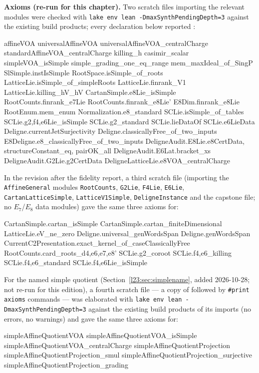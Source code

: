 \textbf{Axioms (re-run for this chapter).} Two scratch files importing the relevant modules were checked with
\texttt{lake env lean -DmaxSynthPendingDepth=3} against the existing build products; every declaration below reported
:
\begin{plaincode}
affineVOA  universalAffineVOA  universalAffineVOA_centralCharge  standardAffineVOA_centralCharge
killing_h  casimir_scalar  simpleVOA_isSimple  simple_grading_one_eq_range
mem_maxIdeal_of_SingP  SlSimple.instIsSimple  RootSpace.isSimple_of_roots
LatticeLie.isSimple_of_simpleRoots  LatticeLie.finrank_V1  LatticeLie.killing_hV_hV
CartanSimple.e8Lie_isSimple  RootCounts.finrank_e7Lie  RootCounts.finrank_e8Lie'
E8Dim.finrank_e8Lie  RootEnum.mem_enum  Normalization.e8_standard
SCLie.isSimple_of_tables  SCLie.{g2,f4,e6}Lie_isSimple  SCLie.g2_standard
SCLie.lieDataOf  SCLie.e6LieData  Deligne.currentJetSurjectivity
Deligne.classicallyFree_of_two_inputs  E8Deligne.e8_classicallyFree_of_two_inputs
DeligneAudit.E8Lie.{e8CertData, structureConstant_eq, pairOK_all}
DeligneAudit.E6Lat.bracket_xs  DeligneAudit.G2Lie.g2CertData
DeligneLatticeLie.e8VOA_centralCharge
\end{plaincode}
In the revision after the fidelity report, a third scratch file (importing the \texttt{AffineGeneral} modules \texttt{RootCounts}, \texttt{G2Lie}, \texttt{F4Lie},
\texttt{E6Lie}, \texttt{CartanLatticeSimple}, \texttt{LatticeV1Simple}, \texttt{DeligneInstance} and the capstone file; no $E_7$/$E_8$
data modules) gave the same three axioms for:
\begin{plaincode}
CartanSimple.cartan_isSimple  CartanSimple.cartan_finiteDimensional  LatticeLie.eV_ne_zero
Deligne.universal_genWordsSpan  Deligne.genWordsSpan
CurrentC2Presentation.exact_kernel_of_caseClassicallyFree
RootCounts.card_roots_{d4,e6,e7,e8'}  SCLie.g2_coroot
SCLie.{f4,e6}_killing  SCLie.{f4,e6}_standard  SCLie.{f4,e6}Lie_isSimple
\end{plaincode}
For the named simple quotient (Section~\ref{l23:sec:simplename}, added 2026-10-28; not re-run for this edition), a fourth scratch file --- a copy of
 followed by \texttt{\#print axioms} commands --- was
elaborated with \texttt{lake env lean -DmaxSynthPendingDepth=3} against the existing build products of its imports (no errors, no
warnings) and gave the same three axioms for:
\begin{plaincode}
simpleAffineQuotientVOA  simpleAffineQuotientVOA_isSimple  simpleAffineQuotientVOA_centralCharge
simpleAffineQuotientProjection  simpleAffineQuotientProjection_smul
simpleAffineQuotientProjection_surjective  simpleAffineQuotientProjection_grading
\end{plaincode}
